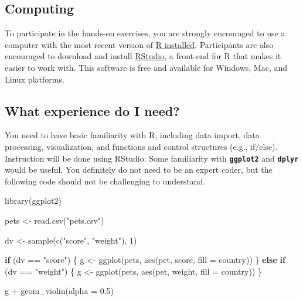 \documentclass[
  oneside]{book}
\newenvironment{Shaded}{\begin{snugshade}}{\end{snugshade}}
\newcommand{\AttributeTok}[1]{\textcolor[rgb]{0.77,0.63,0.00}{#1}}
\newcommand{\ControlFlowTok}[1]{\textcolor[rgb]{0.13,0.29,0.53}{\textbf{#1}}}
\newcommand{\DecValTok}[1]{\textcolor[rgb]{0.00,0.00,0.81}{#1}}
\newcommand{\FloatTok}[1]{\textcolor[rgb]{0.00,0.00,0.81}{#1}}
\newcommand{\FunctionTok}[1]{\textcolor[rgb]{0.00,0.00,0.00}{#1}}
\newcommand{\NormalTok}[1]{#1}
\newcommand{\OtherTok}[1]{\textcolor[rgb]{0.56,0.35,0.01}{#1}}
\newcommand{\SpecialCharTok}[1]{\textcolor[rgb]{0.00,0.00,0.00}{#1}}
\newcommand{\StringTok}[1]{\textcolor[rgb]{0.31,0.60,0.02}{#1}}
\begin{document}
\hypertarget{computing}{%
\subsection{Computing}\label{computing}}

To participate in the hands-on exercises, you are strongly encouraged to use a computer with the most recent version of \href{https://www.r-project.org/}{R installed}. Participants are also encouraged to download and install \href{https://www.rstudio.com/products/rstudio/download/}{RStudio}, a front-end for R that makes it easier to work with. This software is free and available for Windows, Mac, and Linux platforms.

\hypertarget{what-experience-do-i-need}{%
\subsection{What experience do I need?}\label{what-experience-do-i-need}}

You need to have basic familiarity with R, including data import, data processing, visualization, and functions and control structures (e.g., if/else). Instruction will be done using RStudio. Some familiarity with \textbf{\texttt{ggplot2}} and \textbf{\texttt{dplyr}} would be useful. You definitely do not need to be an expert coder, but the following code should not be challenging to understand.

\begin{Shaded}
\begin{Highlighting}[]
\FunctionTok{library}\NormalTok{(ggplot2)}

\NormalTok{pets }\OtherTok{\textless{}{-}} \FunctionTok{read.csv}\NormalTok{(}\StringTok{"pets.csv"}\NormalTok{)}

\NormalTok{dv }\OtherTok{\textless{}{-}} \FunctionTok{sample}\NormalTok{(}\FunctionTok{c}\NormalTok{(}\StringTok{"score"}\NormalTok{, }\StringTok{"weight"}\NormalTok{), }\DecValTok{1}\NormalTok{)}

\ControlFlowTok{if}\NormalTok{ (dv }\SpecialCharTok{==} \StringTok{"score"}\NormalTok{) \{}
\NormalTok{  g }\OtherTok{\textless{}{-}} \FunctionTok{ggplot}\NormalTok{(pets, }\FunctionTok{aes}\NormalTok{(pet, score, }\AttributeTok{fill =}\NormalTok{ country))}
\NormalTok{\} }\ControlFlowTok{else} \ControlFlowTok{if}\NormalTok{ (dv }\SpecialCharTok{==} \StringTok{"weight"}\NormalTok{) \{}
\NormalTok{  g }\OtherTok{\textless{}{-}} \FunctionTok{ggplot}\NormalTok{(pets, }\FunctionTok{aes}\NormalTok{(pet, weight, }\AttributeTok{fill =}\NormalTok{ country))}
\NormalTok{\}}

\NormalTok{g }\SpecialCharTok{+} \FunctionTok{geom\_violin}\NormalTok{(}\AttributeTok{alpha =} \FloatTok{0.5}\NormalTok{)}
\end{Highlighting}
\end{Shaded}
\end{document}
